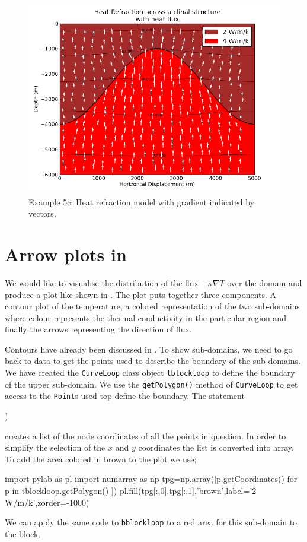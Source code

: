 \begin{figure}[ht]
\centerline{\includegraphics[width=5.in]{figures/heatrefractionflux}}
\caption{Example 5c: Heat refraction model with gradient indicated by vectors.}
\label{fig:hr001qumodel}
\end{figure}

\section{Arrow plots in \mpl}
We would like to visualise the distribution of the flux $-\kappa \nabla T$ over the domain 
and produce a plot like shown in . 
The plot puts together three components. A contour plot of the temperature,
a colored representation of the two sub-domains where colour represents the thermal conductivity 
in the particular region and finally the arrows representing the direction of flux.

Contours have already been discussed in . To show sub-domains, 
we need to go back to \pycad data to get the points used to describe the boundary of the 
sub-domains. We have created the \verb|CurveLoop| class object 
\verb|tblockloop| to define the boundary of the upper sub-domain. 
We use the \verb|getPolygon()| method of \verb|CurveLoop| to get
access to the \verb|Point|s used top define the boundary. The statement
\begin{python}
)
\end{python}
creates a list of the node coordinates of all the points in question. In order 
to simplify the selection of the $x$ and $y$ coordinates the list is converted 
into \modnumpy array. To add the area colored in brown to the plot we use; 
\begin{python}
import pylab as pl
import numarray as np
tpg=np.array([p.getCoordinates() for p in tblockloop.getPolygon() ])
pl.fill(tpg[:,0],tpg[:,1],'brown',label='2 W/m/k',zorder=-1000)
\end{python}
We can apply the same code to \verb|bblockloop| to a red area for this sub-domain to the block.

